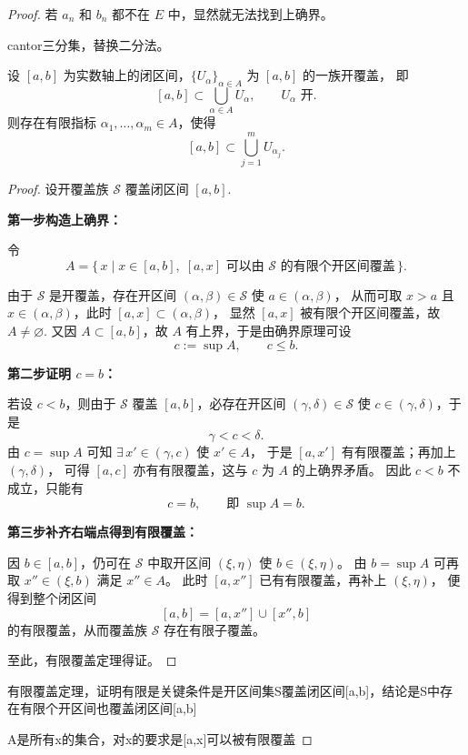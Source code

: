 \documentclass[lang=cn,10pt]{elegantbook}
\begin{document}
\begin{proof}
若 $a_n$ 和 $b_n$ 都不在 $E$ 中，显然就无法找到上确界。\\
\begin{definition}
    cantor三分集，替换二分法。
\end{definition}
\begin{theorem}[有限覆盖定理]\label{thm:HB-interval}
设 $[a,b]$ 为实数轴上的闭区间，$\{U_\alpha\}_{\alpha\in A}$ 为 $[a,b]$ 的一族开覆盖，
即
\[
  [a,b] \subset \bigcup_{\alpha\in A} U_\alpha,\qquad
  U_\alpha \text{ 开}.
\]
则存在有限指标 $\alpha_1,\dots,\alpha_m\in A$，使得
\[
  [a,b] \subset \bigcup_{j=1}^m U_{\alpha_j}.
\]
\end{theorem}
\begin{proof}
设开覆盖族 $\mathcal{S}$ 覆盖闭区间 $[a,b]$.
\medskip

\noindent\textbf{第一步\;构造上确界：}

令
\[
  A=\bigl\{\,x \mid x\in[a,b],\;[a,x]\text{ 可以由 }\mathcal{S}
  \text{ 的有限个开区间覆盖}\,\bigr\}.
\]

由于 $\mathcal{S}$ 是开覆盖，存在开区间 $(\alpha,\beta)\in\mathcal{S}$ 使 $a\in(\alpha,\beta)$，
从而可取 $x>a$ 且 $x\in(\alpha,\beta)$，此时 $[a,x]\subset(\alpha,\beta)$，
显然 $[a,x]$ 被有限个开区间覆盖，故 $A\neq\varnothing$.
又因 $A\subset[a,b]$，故 $A$ 有上界，于是由确界原理可设
\[
  c:=\sup A,\qquad c\le b.
\]

\noindent\textbf{第二步\;证明 $c=b$：}

若设 $c<b$，则由于 $\mathcal{S}$ 覆盖 $[a,b]$，必存在开区间
$(\gamma,\delta)\in\mathcal{S}$ 使 $c\in(\gamma,\delta)$，于是
\[
  \gamma < c < \delta.
\]
由 $c=\sup A$ 可知 $\exists\,x'\in(\gamma,c)$ 使 $x'\in A$，
于是 $[a,x']$ 有有限覆盖；再加上 $(\gamma,\delta)$，
可得 $[a,c]$ 亦有有限覆盖，这与 $c$ 为 $A$ 的上确界矛盾。
因此 $c<b$ 不成立，只能有
\[
  c=b,\qquad\text{即 } \sup A = b.
\]

\noindent\textbf{第三步\;补齐右端点得到有限覆盖：}

因 $b\in[a,b]$，仍可在 $\mathcal{S}$ 中取开区间 $(\xi,\eta)$ 使 $b\in(\xi,\eta)$。
由 $b=\sup A$ 可再取 $x''\in(\xi,b)$ 满足 $x''\in A$。
此时 $[a,x'']$ 已有有限覆盖，再补上 $(\xi,\eta)$，
便得到整个闭区间
\[
  [a,b]=[a,x'']\cup[x'',b]
\]
的有限覆盖，从而覆盖族 $\mathcal{S}$ 存在有限子覆盖。

至此，有限覆盖定理得证。
\end{proof}
有限覆盖定理，证明有限是关键条件是开区间集S覆盖闭区间[a,b]，结论是S中存在有限个开区间也覆盖闭区间[a,b]

A是所有x的集合，对x的要求是[a,x]可以被有限覆盖


\end{proof}
\end{document}
